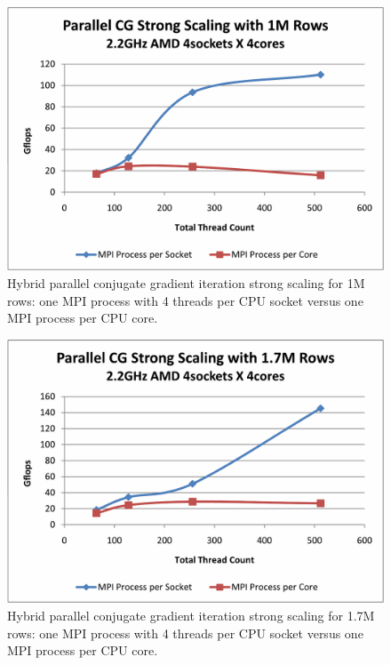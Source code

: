 \begin{figure}[h]
\center
\includegraphics[viewport=1in 0.5in 8.5in 6.5in,angle=0,scale=0.5]{figures/StrongScaling1000k}
\caption{Hybrid parallel conjugate gradient iteration strong scaling for 1M rows: one MPI process with 4 threads per CPU socket versus one MPI process per CPU core.}
\label{fig:CGPerf:scaling1M}
\end{figure}

\begin{figure}[h]
\center
\includegraphics[viewport=1in 0.5in 8.5in 6.5in,angle=0,scale=0.5]{figures/StrongScaling1700k}
\caption{Hybrid parallel conjugate gradient iteration strong scaling for 1.7M rows: one MPI process with 4 threads per CPU socket versus one MPI process per CPU core.}
\label{fig:CGPerf:scaling1.7M}
\end{figure}


